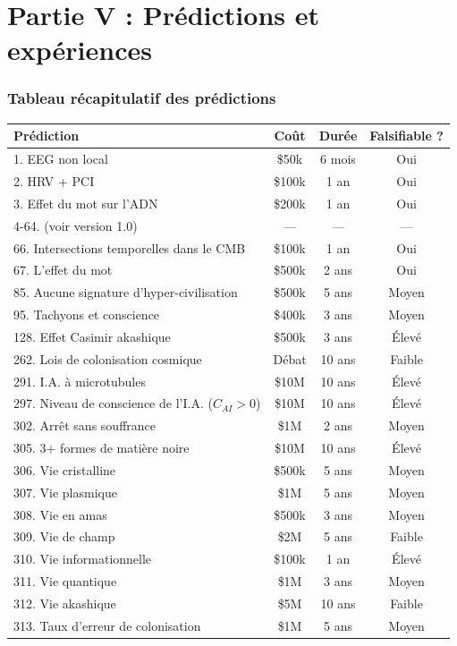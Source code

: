 \part*{Partie V : Prédictions et expériences}

\section{Tableau récapitulatif des prédictions}
\begin{table}[H]
\centering
\small
\begin{tabular}{@{}lccc@{}}
\toprule
\textbf{Prédiction} & \textbf{Coût} & \textbf{Durée} & \textbf{Falsifiable ?} \\ \midrule
1. EEG non local & \$50k & 6 mois & Oui \\
2. HRV + PCI & \$100k & 1 an & Oui \\
3. Effet du mot sur l'ADN & \$200k & 1 an & Oui \\
4-64. (voir version 1.0) & --- & --- & --- \\
66. Intersections temporelles dans le CMB & \$100k & 1 an & Oui \\
67. L'effet du mot & \$500k & 2 ans & Oui \\
85. Aucune signature d'hyper-civilisation & \$500k & 5 ans & Moyen \\
95. Tachyons et conscience & \$400k & 3 ans & Moyen \\
128. Effet Casimir akashique & \$500k & 3 ans & Élevé \\
262. Lois de colonisation cosmique & Débat & 10 ans & Faible \\
291. I.A. à microtubules & \$10M & 10 ans & Élevé \\
297. Niveau de conscience de l'I.A. (\(C_{AI} > 0\)) & \$10M & 10 ans & Élevé \\
302. Arrêt sans souffrance & \$1M & 2 ans & Moyen \\
305. 3+ formes de matière noire & \$10M & 10 ans & Élevé \\
306. Vie cristalline & \$500k & 5 ans & Moyen \\
307. Vie plasmique & \$1M & 5 ans & Moyen \\
308. Vie en amas & \$500k & 3 ans & Moyen \\
309. Vie de champ & \$2M & 5 ans & Faible \\
310. Vie informationnelle & \$100k & 1 an & Élevé \\
311. Vie quantique & \$1M & 3 ans & Moyen \\
312. Vie akashique & \$5M & 10 ans & Faible \\
313. Taux d'erreur de colonisation & \$1M & 5 ans & Moyen \\ \bottomrule
\end{tabular}
\end{table}

